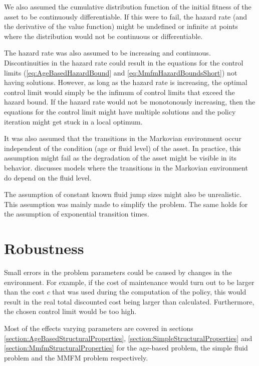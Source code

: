 \documentclass[a4paper]{thesis}
\theoremstyle{definition}
\begin{document}
We also assumed the cumulative distribution function of the initial fitness of the asset to be continuously differentiable.
If this were to fail, the hazard rate (and the derivative of the value function) might be undefined or infinite at points where the distribution would not be continuous or differentiable.

The hazard rate was also assumed to be increasing and continuous.
Discontinuities in the hazard rate could result in the equations for the control limits (\eqref{eq:AgeBasedHazardBound} and \eqref{eq:MmfmHazardBoundsShort}) not having solutions.
However, as long as the hazard rate is increasing, the optimal control limit would simply be the infimum of control limits that exceed the hazard bound.
If the hazard rate would not be monotonously increasing, then the equations for the control limit might have multiple solutions and the policy iteration might get stuck in a local optimum.

It was also assumed that the transitions in the Markovian environment occur independent of the condition (age or fluid level) of the asset.
In practice, this assumption might fail as the degradation of the asset might be visible in its behavior.
\cite{Scheinhardt1998} discusses models where the transitions in the Markovian environment do depend on the fluid level.

The assumption of constant known fluid jump sizes might also be unrealistic.
This assumption was mainly made to simplify the problem.
The same holds for the assumption of exponential transition times.

\section{Robustness}
Small errors in the problem parameters could be caused by changes in the environment.
For example, if the cost of maintenance would turn out to be larger than the cost $c$ that was used during the computation of the policy, this would result in the real total discounted cost being larger than calculated.
Furthermore, the chosen control limit would be too high. 

Most of the effects varying parameters are covered in sections \ref{section:AgeBasedStructuralProperties}, \ref{section:SimpleStructuralProperties} and \ref{section:MmfmStructuralProperties} for the age-based problem, the simple fluid problem and the MMFM problem respectively.



\end{document}
